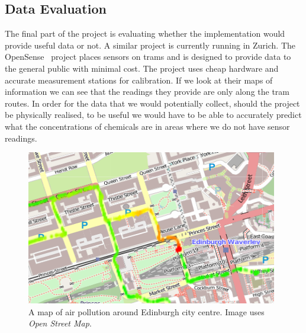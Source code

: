 \documentclass[12pt,a4paper,notitlepage]{article}
\begin{document}
\subsection{Data Evaluation}

The final part of the project is evaluating whether the implementation would provide useful data or not. A similar project is currently running in Zurich. The OpenSense~\cite{opensensezurich} project places sensors on trams and is designed to provide data to the general public with minimal cost. The project uses cheap hardware and accurate measurement stations for calibration. If we look at their maps of information we can see that the readings they provide are only along the tram routes. In order for the data that we would potentially collect, should the project be physically realised, to be useful we would have to be able to accurately predict what the concentrations of chemicals are in areas where we do not have sensor readings. 

\begin{figure}[H]
    \begin{center}
        \includegraphics[width=\textwidth]{../images/StationaryPollutantBuildUp.png}
        \caption{A map of air pollution around Edinburgh city centre. Image uses \emph{Open Street Map}.}
        \label{fig:stationarypollutantbuildup}
    \end{center}
\end{figure}
\end{document}
